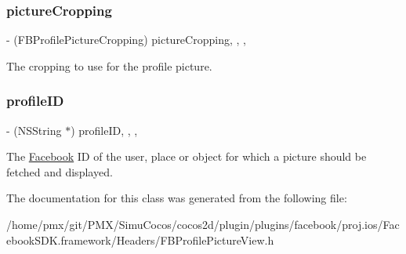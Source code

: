 \subsubsection{\texorpdfstring{picture\+Cropping}{pictureCropping}}
{\footnotesize\ttfamily -\/ (F\+B\+Profile\+Picture\+Cropping) picture\+Cropping\hspace{0.3cm}{\ttfamily [read]}, {\ttfamily [write]}, {\ttfamily [nonatomic]}, {\ttfamily [assign]}}

The cropping to use for the profile picture. \mbox{\label{interfaceFBProfilePictureView_a5aaebc13e66a2d258e3511f5ba3fa294}} 
\subsubsection{\texorpdfstring{profile\+ID}{profileID}}
{\footnotesize\ttfamily -\/ (N\+S\+String $\ast$) profile\+ID\hspace{0.3cm}{\ttfamily [read]}, {\ttfamily [write]}, {\ttfamily [nonatomic]}, {\ttfamily [copy]}}

The \hyperlink{interfaceFacebook}{Facebook} ID of the user, place or object for which a picture should be fetched and displayed. 

The documentation for this class was generated from the following file\+:\begin{DoxyCompactItemize}
\item 
/home/pmx/git/\+P\+M\+X/\+Simu\+Cocos/cocos2d/plugin/plugins/facebook/proj.\+ios/\+Facebook\+S\+D\+K.\+framework/\+Headers/F\+B\+Profile\+Picture\+View.\+h\end{DoxyCompactItemize}
